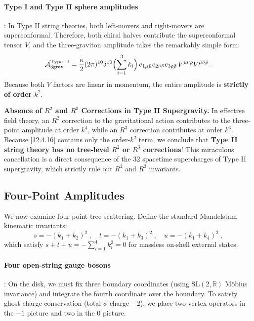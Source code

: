 \paragraph*{Type I and Type II sphere amplitudes}: In Type II string theories, both left-movers and right-movers are superconformal. Therefore, both chiral halves contribute the superconformal tensor $V$, and the three-graviton amplitude takes the remarkably simple form:
\begin{equation}
	\mathcal{A}_{3\mathrm{grav}}^{\mathrm{Type\ II}} = \frac{\kappa}{2}(2\pi)^{10}\delta^{10}\Bigl(\sum_{i=1}^3 k_{i}\Bigr)\,e_{1\mu\bar{\mu}}e_{2\nu\bar{\nu}}e_{3\rho\bar{\rho}}\,V^{\mu\nu\rho}V^{\bar{\mu}\bar{\nu}\bar{\rho}} \:. \label{12.4.16}
\end{equation}
Because both $V$ factors are linear in momentum, the entire amplitude is \textbf{strictly of order $k^{2}$}. 
\begin{tcolorbox}[breakable]
	\begin{remark}
		\textbf{Absence of $R^{2}$ and $R^{3}$ Corrections in Type II Supergravity.}
		In effective field theory, an $R^{2}$ correction to the gravitational action contributes to the three-point amplitude at order $k^{4}$, while an $R^{3}$ correction contributes at order $k^{6}$. 
		Because \eqref{12.4.16} contains only the order-$k^{2}$ term, we conclude that \textbf{Type II string theory has no tree-level $R^{2}$ or $R^{3}$ corrections}! This miraculous cancellation is a direct consequence of the 32 spacetime supercharges of Type II supergravity, which strictly rule out $R^{2}$ and $R^{3}$ invariants.
	\end{remark}
\end{tcolorbox}

\subsection*{Four-Point Amplitudes}

We now examine four-point tree scattering. 
Define the standard Mandelstam kinematic invariants:
\begin{equation}
	s = -(k_{1}+k_{2})^{2} \:, \quad t = -(k_{1}+k_{3})^{2} \:, \quad u = -(k_{1}+k_{4})^{2} \:, \label{12.4.24}
\end{equation}
which satisfy $s + t + u = -\sum_{i=1}^{4}k_{i}^{2} = 0$ for massless on-shell external states.

\paragraph*{Four open-string gauge bosons}: On the disk, we must fix three boundary coordinates (using $\mathrm{SL}(2,\mathbb{R})$ Möbius invariance) and integrate the fourth coordinate over the boundary. To satisfy ghost charge conservation (total $\phi$-charge $-2$), we place two vertex operators in the $-1$ picture and two in the $0$ picture.

